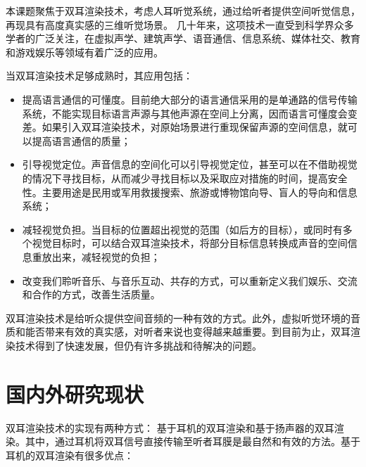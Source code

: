 本课题聚焦于双耳渲染技术，考虑人耳听觉系统，通过给听者提供空间听觉信息，再现具有高度真实感的三维听觉场景。
几十年来，这项技术一直受到科学界众多学者的广泛关注，在虚拟声学、建筑声学、语音通信、信息系统、媒体社交、教育和游戏娱乐等领域有着广泛的应用。


\newpage

当双耳渲染技术足够成熟时，其应用包括：
\begin{itemize}[leftmargin=*]
\item 提高语言通信的可懂度。目前绝大部分的语言通信采用的是单通路的信号传输系统，不能实现目标语言声源与其他声源在空间上分离，因而语言可懂度会变差。如果引入双耳渲染技术，对原始场景进行重现保留声源的空间信息，就可以提高语言通信的质量；
\item 引导视觉定位。声音信息的空间化可以引导视觉定位，甚至可以在不借助视觉的情况下寻找目标，从而减少寻找目标以及采取应对措施的时间，提高安全性。主要用途是民用或军用救援搜索、旅游或博物馆向导、盲人的导向和信息系统；
\item 减轻视觉负担。当目标的位置超出视觉的范围（如后方的目标），或同时有多个视觉目标时，可以结合双耳渲染技术，将部分目标信息转换成声音的空间信息重放出来，减轻视觉的负担；
\item 改变我们聆听音乐、与音乐互动、共存的方式，可以重新定义我们娱乐、交流和合作的方式，改善生活质量。
\end{itemize}




双耳渲染技术是给听众提供空间音频的一种有效的方式。此外，虚拟听觉环境的音质和能否带来有效的真实感，对听者来说也变得越来越重要。到目前为止，双耳渲染技术得到了快速发展，但仍有许多挑战和待解决的问题。%

\section{国内外研究现状}


双耳渲染技术的实现有两种方式： 基于耳机的双耳渲染和基于扬声器的双耳渲染。其中，通过耳机将双耳信号直接传输至听者耳膜是最自然和有效的方法。基于耳机的双耳渲染有很多优点：

